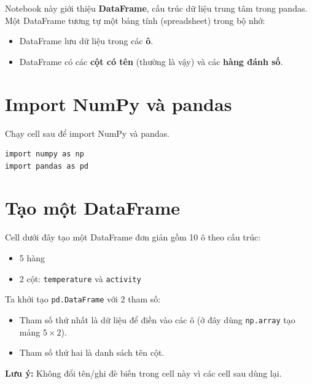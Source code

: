 \documentclass[12pt,a4paper]{article}
\begin{document}
\begin{dongco}[title={DataFrame là gì?}]
Notebook này giới thiệu \textbf{DataFrame}, cấu trúc dữ liệu trung tâm trong pandas.
Một DataFrame tương tự một bảng tính (spreadsheet) trong bộ nhớ:
\begin{itemize}
  \item DataFrame lưu dữ liệu trong các \textbf{ô}.
  \item DataFrame có các \textbf{cột có tên} (thường là vậy) và các \textbf{hàng đánh số}.
\end{itemize}
\end{dongco}

\section{Import NumPy và pandas}

\begin{phuongphap}[title={Import module}]
Chạy cell sau để import NumPy và pandas.
\end{phuongphap}

\begin{lstlisting}
import numpy as np
import pandas as pd
\end{lstlisting}

\section{Tạo một DataFrame}

\begin{phuongphap}[title={Tạo DataFrame từ mảng NumPy}]
Cell dưới đây tạo một DataFrame đơn giản gồm 10 ô theo cấu trúc:
\begin{itemize}
  \item 5 hàng
  \item 2 cột: \texttt{temperature} và \texttt{activity}
\end{itemize}

Ta khởi tạo \texttt{pd.DataFrame} với 2 tham số:
\begin{itemize}
  \item Tham số thứ nhất là dữ liệu để điền vào các ô (ở đây dùng \texttt{np.array} tạo mảng $5\times 2$).
  \item Tham số thứ hai là danh sách tên cột.
\end{itemize}

\textbf{Lưu ý:} Không đổi tên/ghi đè biến trong cell này vì các cell sau dùng lại.
\end{phuongphap}
\end{document}
